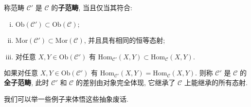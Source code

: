 \documentclass[UTF8]{book}
\begin{document}
\begin{definition}
    称范畴 $\mathcal{C}'$ 是 $\mathcal{C}$ 的\textbf{子范畴}, 
    当且仅当其符合: 
    \begin{enumerate}[(i)]
        \item $\mathrm{Ob}(\mathcal{C}')\subset \mathrm{Ob}(\mathcal{C})$; 
        \item $\mathrm{Mor}(\mathcal{C}')\subset \mathrm{Mor}(\mathcal{C})$, 
        并且具有相同的恒等态射; 
        \item 对任意 $X,Y \in \mathrm{Ob}(\mathcal{C}')$ 有 
        $\mathrm{Hom}_{\mathcal{C}'}(X,Y) \subset \mathrm{Hom}_{\mathcal{C}}(X,Y)$. 
    \end{enumerate}
    如果对任意 $X,Y \in \mathrm{Ob}(\mathcal{C}')$ 有 
    $\mathrm{Hom}_{\mathcal{C}'}(X,Y) = \mathrm{Hom}_{\mathcal{C}}(X,Y)$. 
    则称 $\mathcal{C}'$ 是 $\mathcal{C}$ 的\textbf{全子范畴}, 
    此时 $\mathcal{C}'$ 和 $\mathcal{C}$ 的差别由对象完全体现, 
    它继承了 $\mathcal{C}$ 上能继承的所有态射. 
\end{definition}

我们可以举一些例子来体悟这些抽象废话. 
\end{document}
